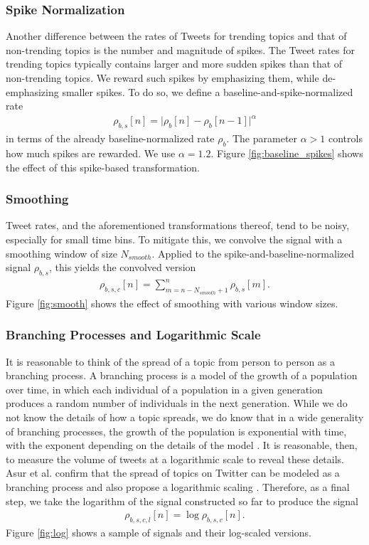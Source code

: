 \subsubsection{Spike Normalization}
Another difference between the rates of Tweets for trending topics and that of
non-trending topics is the number and magnitude of spikes. The Tweet rates for
trending topics typically contains larger and more sudden spikes than that of
non-trending topics. We reward such spikes by emphasizing them, while
de-emphasizing smaller spikes. To do so, we define a
baseline-and-spike-normalized rate
\begin{gather}
\rho_{b,s}[n] = \big|\rho_b[n] - \rho_b[n-1]\big|^{\alpha}
\end{gather}
in terms of the already baseline-normalized rate $\rho_b$.  The parameter
$\alpha > 1$ controls how much spikes are rewarded. We use $\alpha =
1.2$. Figure \ref{fig:baseline_spikes} shows the effect of this spike-based
transformation.

\subsubsection{Smoothing}
Tweet rates, and the aforementioned transformations thereof, tend to be noisy,
especially for small time bins. To mitigate this, we convolve the signal with a
smoothing window of size $N_{smooth}$. Applied to the
spike-and-baseline-normalized signal $\rho_{b,s}$, this yields the convolved
version
\begin{gather}
\rho_{b,s,c}[n] = \sum_{m = n-N_{smooth}+1}^{n} \rho_{b,s}[m].
\end{gather}
Figure \ref{fig:smooth} shows the effect of smoothing with various window sizes.

\subsubsection{Branching Processes and Logarithmic Scale}
It is reasonable to think of the spread of a topic from person to person as a
branching process. A branching process is a model of the growth of a population
over time, in which each individual of a population in a given generation
produces a random number of individuals in the next generation. While we do not
know the details of how a topic spreads, we do know that in a wide generality of
branching processes, the growth of the population is exponential with time, with
the exponent depending on the details of the model \cite{AthreyaNey}. It is
reasonable, then, to measure the volume of tweets at a logarithmic scale to
reveal these details. Asur et al. confirm that the spread of topics on Twitter
can be modeled as a branching process and also propose a logarithmic scaling
\cite{Asur}. Therefore, as a final step, we take the logarithm of the signal
constructed so far to produce the signal
\begin{gather}
\rho_{b,s,c,l}[n] = \log \rho_{b,s,c}[n].
\end{gather}
Figure \ref{fig:log} shows a sample of signals and their log-scaled versions.

